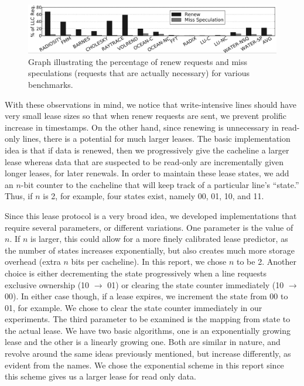 \documentclass[12pt]{article}
\begin{document}
\begin{figure}
\begin{center}
  \includegraphics[width=16cm]{image1.png}
  \caption{Graph illustrating the percentage of renew requests and miss speculations (requests that are actually necessary) for various benchmarks. }
  \label{fig:renewals}
\end{center}
\end{figure}

With these observations in mind, we notice that write-intensive lines 
should have very small lease sizes so that when renew requests are 
sent, we prevent prolific increase in timestamps. On the other hand, 
since renewing is unnecessary in read-only lines, there is a potential 
for much larger leases. The basic implementation idea is that if data
is renewed, then we progressively give the cacheline a larger lease 
whereas data that are suspected to be read-only are incrementally 
given longer leases, for later renewals. In order to maintain these 
lease states, we add an $n$-bit counter to the cacheline that will 
keep track of a particular line's “state.” Thus, if $n$ is 2, for 
example, four states exist, namely 00, 01, 10, and 11. 

Since this lease protocol is a very broad idea, we developed 
implementations that require several parameters, or different  %
variations. One parameter is the value of $n$. If $n$ is larger, this 
could allow for a more finely calibrated lease predictor, as the number of %
states increases exponentially, but also creates much more storage 
overhead (extra $n$ bits per cacheline). In this report, we chose $n$ 
to be 2. Another choice is either decrementing the state progressively 
when a line requests exclusive ownership (10 $\rightarrow$ 01) or 
clearing the state counter immediately (10 $\rightarrow$ 00). In 
either case though, if a lease expires, we increment the state from 00 
to 01, for example. We chose to clear the state counter immediately in 
our experiments. The third parameter to be examined is the mapping 
from state to the actual lease. We have two basic algorithms, one is 
an exponentially growing lease and the other is a linearly growing 
one.  Both are similar in nature, and revolve around the same ideas 
previously mentioned, but increase differently, as evident from the 
names. We chose the exponential scheme in this report since this 
scheme gives us a larger lease for read only data.
\end{document}
